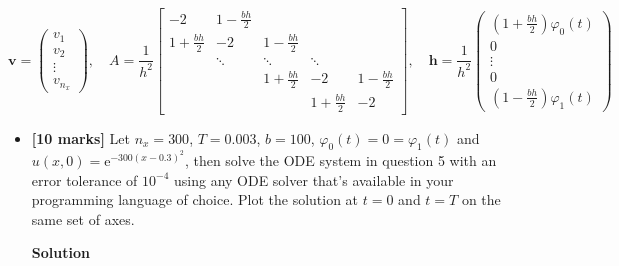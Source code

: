 \documentclass[12pt,a4paper]{article}
\begin{document}
\begin{equation*}
\mathbf{v} = \left(\begin{array}{c}
v_1\\
v_2 \\
\vdots \\
v_{n_x}
\end{array}
\right), \quad A = \frac{1}{h^2}\begin{bmatrix}
-2 & 1 - \frac{bh}{2} & & & \\
1 + \frac{bh}{2}  & -2 & 1 - \frac{bh}{2}  & & \\
      & \ddots & \ddots & \ddots & \\
      &        & 1 + \frac{bh}{2}    & -2 & 1 - \frac{bh}{2} \\
      &        &        &1 + \frac{bh}{2}      & -2
\end{bmatrix}, \quad
\mathbf{h} = \frac{1}{h^2}\left(\begin{array}{c} 
\left(1 + \frac{bh}{2}\right)\varphi_0(t)\\
0 \\
\vdots \\
0 \\
\left(1 - \frac{bh}{2}\right)\varphi_1(t)
\end{array}
\right)
\end{equation*}
\begin{itemize}
\item[10. ] \textbf{[10 marks]} Let $n_x = 300$, $T = 0.003$, $b = 100$, $\varphi_0(t) = 0 = \varphi_1(t)$ and $u(x,0) = \mathrm{e}^{-300(x-0.3)^2}$, then solve the ODE system in question 5 with an error tolerance of $10^{-4}$ using any ODE solver that's available in your programming language of choice.  Plot the solution at $t = 0$ and $t = T$ on the same set of axes.

\textbf{Solution}

\end{itemize}
\end{document}
